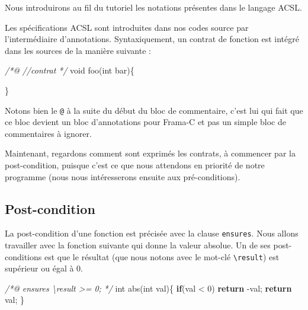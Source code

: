 \documentclass[12pt,francais,]{scrbook}
\newenvironment{Shaded}{}{}
\newcommand{\KeywordTok}[1]{\textcolor[rgb]{0.00,0.44,0.13}{\textbf{{#1}}}}
\newcommand{\DataTypeTok}[1]{\textcolor[rgb]{0.56,0.13,0.00}{{#1}}}
\newcommand{\DecValTok}[1]{\textcolor[rgb]{0.25,0.63,0.44}{{#1}}}
\newcommand{\CommentTok}[1]{\textcolor[rgb]{0.38,0.63,0.69}{\textit{{#1}}}}
\newcommand{\NormalTok}[1]{{#1}}
\begin{document}
Nous introduirons au fil du tutoriel les notations présentes dans le
langage ACSL.

Les spécifications ACSL sont introduites dans nos codes source par
l'intermédiaire d'annotations. Syntaxiquement, un contrat de fonction
est intégré dans les sources de la manière suivante :

\begin{footnotesize}\begin{Shaded}
\begin{Highlighting}[]
\CommentTok{/*@}
\CommentTok{  //contrat}
\CommentTok{*/}
\DataTypeTok{void} \NormalTok{foo(}\DataTypeTok{int} \NormalTok{bar)\{}

\NormalTok{\}}
\end{Highlighting}
\end{Shaded}\end{footnotesize}

Notons bien le \texttt{@} à la suite du début du bloc de commentaire,
c'est lui qui fait que ce bloc devient un bloc d'annotations pour
Frama-C et pas un simple bloc de commentaires à ignorer.

Maintenant, regardons comment sont exprimés les contrats, à commencer
par la post-condition, puisque c'est ce que nous attendons en priorité
de notre programme (nous nous intéresserons ensuite aux pré-conditions).

\subsection{Post-condition}\label{post-condition}

La post-condition d'une fonction est précisée avec la clause
\texttt{ensures}. Nous allons travailler avec la fonction suivante qui
donne la valeur absolue. Un de ses post-conditions est que le résultat
(que nous notons avec le mot-clé \texttt{\textbackslash{}result}) est
supérieur ou égal à 0.

\begin{footnotesize}\begin{Shaded}
\begin{Highlighting}[]
\CommentTok{/*@}
\CommentTok{  ensures \textbackslash{}result >= 0;}
\CommentTok{*/}
\DataTypeTok{int} \NormalTok{abs(}\DataTypeTok{int} \NormalTok{val)\{}
  \KeywordTok{if}\NormalTok{(val < }\DecValTok{0}\NormalTok{) }\KeywordTok{return} \NormalTok{-val;}
  \KeywordTok{return} \NormalTok{val;}
\NormalTok{\}}
\end{Highlighting}
\end{Shaded}\end{footnotesize}
\end{document}
